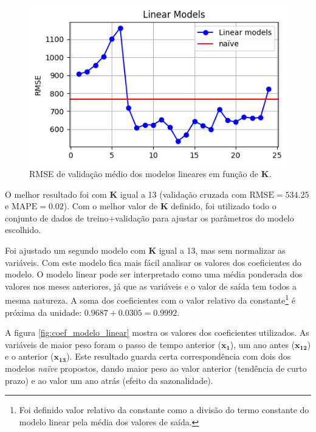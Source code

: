 \documentclass[final,5p]{elsarticle}
\numberwithin{equation}{section}
\begin{document}
    \begin{figure}[hbt!]
        \includegraphics[width=0.95\columnwidth]{B1_LinearModels.png}
        \caption{RMSE de validação médio dos modelos lineares em função de \textbf{K}.}
        \label{fig:modelos_lineares}
    \end{figure}

    O melhor resultado foi com \textbf{K} igual a 13 (validação cruzada com $\text{RMSE} = 534.25$ e $\text{MAPE} = 0.02$). Com o melhor valor de \textbf{K} definido, foi utilizado todo o conjunto de dados de treino+validação para ajustar os parâmetros do modelo escolhido.

    Foi ajustado um segundo modelo com \textbf{K} igual a 13, mas sem normalizar as variáveis. Com este modelo fica mais fácil analisar os valores dos coeficientes do modelo. O modelo linear pode ser interpretado como uma média ponderada dos valores nos meses anteriores, já que as variáveis e o valor de saída tem todos a mesma natureza. A soma dos coeficientes com o valor relativo da constante\footnote{Foi definido valor relativo da constante como a divisão do termo constante do modelo linear pela média dos valores de saída.} é próxima da unidade: $0.9687 + 0.0305 = 0.9992$.

    A figura \ref{fig:coef_modelo_linear} mostra os valores dos coeficientes utilizados. As variáveis de maior peso foram o passo de tempo anterior ($\textbf{x}_{\textbf{1}}$), um ano antes ($\textbf{x}_{\textbf{12}}$) e o anterior ($\textbf{x}_{\textbf{13}}$). Este resultado guarda certa correspondência com dois dos modelos \emph{naïve} propostos, dando maior peso ao valor anterior (tendência de curto prazo) e ao valor um ano atrás (efeito da sazonalidade).
\end{document}
